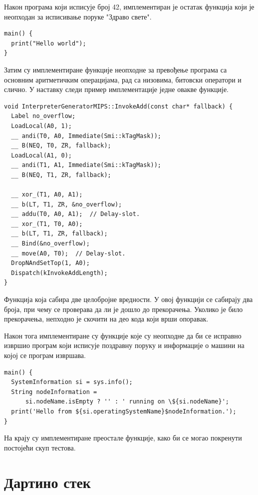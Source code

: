 \documentclass[12pt,oneside]{memoir}
\begin{document}
Након програма који исписује број 42, имплементиран је остатак функција који је неопходан за исписивање поруке "Здраво свете".\\

\begin{verbatim}
main() {
  print("Hello world");
}
\end{verbatim}

Затим су имплементиране функције неопходне за превођење програма са основним аритметичким операцијама, рад са низовима, битовски оператори и слично. У наставку следи пример имплементације једне овакве функције.\\

\begin{verbatim}
void InterpreterGeneratorMIPS::InvokeAdd(const char* fallback) {
  Label no_overflow;
  LoadLocal(A0, 1);
  __ andi(T0, A0, Immediate(Smi::kTagMask));
  __ B(NEQ, T0, ZR, fallback);
  LoadLocal(A1, 0);
  __ andi(T1, A1, Immediate(Smi::kTagMask));
  __ B(NEQ, T1, ZR, fallback);

  __ xor_(T1, A0, A1);
  __ b(LT, T1, ZR, &no_overflow);
  __ addu(T0, A0, A1);  // Delay-slot.
  __ xor_(T1, T0, A0);
  __ b(LT, T1, ZR, fallback);
  __ Bind(&no_overflow);
  __ move(A0, T0);  // Delay-slot.
  DropNAndSetTop(1, A0);
  Dispatch(kInvokeAddLength);
}
\end{verbatim}
Функција која сабира две целобројне вредности.
У овој функцији се сабирају два броја, при чему се проверава да ли је дошло до прекорачења. Уколико је било прекорачења, непходно је скочити на део кода који врши опоравак. 

Након тога имплементиране су функције које су неопходне да би се исправно извршио програм који исписује поздравну поруку и информације о машини на којој се програм извршава.\\

\begin{verbatim}
main() {
  SystemInformation si = sys.info();
  String nodeInformation =
      si.nodeName.isEmpty ? '' : ' running on \${si.nodeName}';
  print('Hello from ${si.operatingSystemName}$nodeInformation.');
}
\end{verbatim}

На крају су имплементиране преостале функције, како би се могао покренути постојећи скуп тестова.

\section{Дартино стек}
\end{document}
